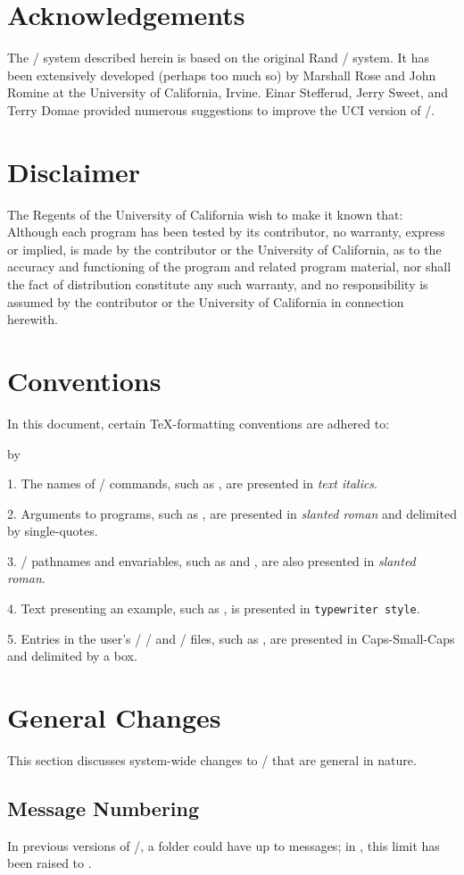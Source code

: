 \banner
\section{Acknowledgements}
The \MH/ system described herein is based on the original Rand \MH/ system.
It has been extensively developed (perhaps too much so) by Marshall Rose and
John Romine at the University of California, Irvine.
Einar Stefferud, Jerry Sweet, and Terry Domae provided numerous suggestions
to improve the UCI version of \MH/.
\section{Disclaimer}
The Regents of the University of California wish to make it known that:
\bigquote
Although each program has been tested by its contributor,
no warranty, express or implied,
is made by the contributor or the University of California,
as to the accuracy and functioning of the program
and related program material,
nor shall the fact of distribution constitute any such warranty,
and no responsibility is assumed by the contributor
or the University of California in connection herewith.
\endbigquote
\section{Conventions}
In this document,
certain \TeX -formatting conventions are adhered to:
{\advance\leftskip by\parindent
\item{1.} The names of \unix/ commands, such as ,
are presented in {\it text italics}.
\item{2.} Arguments to programs, such as ,
are presented in {\sl slanted roman} and delimited by single-quotes.
\item{3.} \unix/ pathnames and envariables,
such as  and ,
are also presented in {\sl slanted roman}.
\item{4.} Text presenting an example, such as ,
is presented in {\tt typewriter style}.
\item{5.} Entries in the user's \MH/ \profile/ and \context/ files,
such as ,
are presented in {\sc Caps-Small-Caps} and delimited by a box.
\smallskip}
\bop\section{General Changes}
This section discusses system-wide changes to \MH/ that are general in nature.
\subsection{Message Numbering}
In previous versions of \MH/, a folder could have up to  messages;
in , this limit has been raised to .
